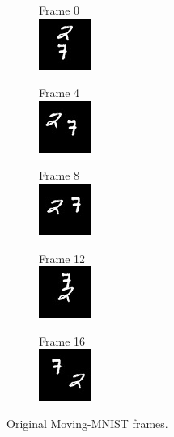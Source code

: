 \renewcommand\thesubfigure{\roman{subfigure}}
\begin{subfigure}[t]{0.9\textwidth}
    \centering
    \begin{subfigure}[t]{0.19\textwidth}
        \centering
        \textrm{Frame 0} \medskip \\
        \includegraphics[scale=1]{figures/mnist0/frame0}
    \end{subfigure}
    \hfill
    \begin{subfigure}[t]{0.19\textwidth}
        \centering
        \textrm{Frame 4} \medskip \\
        \includegraphics[scale=1]{figures/mnist0/frame4}
    \end{subfigure}
    \hfill
    \begin{subfigure}[t]{0.19\textwidth}
        \centering
        \textrm{Frame 8} \medskip \\
        \includegraphics[scale=1]{figures/mnist0/frame8}
    \end{subfigure}
    \hfill
    \begin{subfigure}[t]{0.19\textwidth}
        \centering
        \textrm{Frame 12} \medskip \\
        \includegraphics[scale=1]{figures/mnist0/frame12}
    \end{subfigure}
    \hfill
    \begin{subfigure}[t]{0.19\textwidth}
        \centering
        \textrm{Frame 16} \medskip \\
        \includegraphics[scale=1]{figures/mnist0/frame16}
    \end{subfigure}
    \caption{Original Moving-MNIST frames.}
\end{subfigure}
